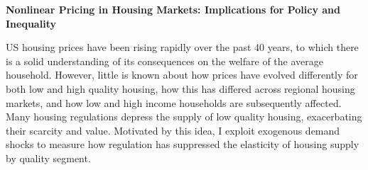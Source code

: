 \documentclass[11pt]{amsart}
\begin{document}
\bigskip
\begin{center}
\LARGE
\textbf{Nonlinear Pricing in Housing Markets: Implications for Policy and Inequality }\\
\large
\normalsize
\end{center}
US housing prices have been rising rapidly over the past 40 years, to which there is a solid understanding of its consequences on the welfare of the average household. However, little is known about how prices have evolved differently for both low and high quality housing, how this has differed across regional housing markets, and how low and high income households are subsequently affected. Many housing regulations depress the supply of low quality housing, exacerbating their scarcity and value. Motivated by this idea, I exploit exogenous demand shocks to measure how regulation has suppressed the elasticity of housing supply by quality segment.  \\
\end{document}
